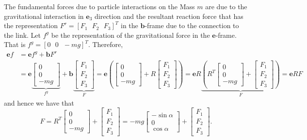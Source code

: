 \documentclass[graybox,envcountchap,sectrefs]{svmonoMuga}
\begin{document}
The fundamental forces due to particle interactions on the Mass $m$ are due to the gravitational interaction in $\mathbf{e}_3$ direction and the resultant reaction force that has the representation
$F^r=[F_1\:\:\:F_2\:\:\:F_3]^T$ in the $\mathbf{b}$-frame due to the connection to the link. Let $f^g$ be the representation of the gravitational force in the $\mathbf{e}$-frame. That is $f^g=[0\:\:\:0\:\:\:-mg]^T$.
Therefore,
\begin{align*}
\mathbf{e}f&=\mathbf{e}f^g+\mathbf{b}F^r\\
&=\mathbf{e}\underbrace{\left[\begin{matrix}
  0 \\
  0\\
  -mg
 \end{matrix}\right]}_{f^g}
+ \mathbf{b}\underbrace{\left[\begin{matrix}
  F_1 \\
  F_2\\
  F_3
 \end{matrix}\right]}_{F}=\mathbf{e} \left(\left[\begin{matrix}
  0 \\
  0\\
  -mg
 \end{matrix}\right]
+ R\left[\begin{matrix}
  F_1 \\
  F_2\\
  F_3
 \end{matrix}\right]\right)=
 \mathbf{e} R\underbrace{\left(R^T\left[\begin{matrix}
  0 \\
  0\\
  -mg
 \end{matrix}\right]
+ \left[\begin{matrix}
  F_1 \\
  F_2\\
  F_3
 \end{matrix}\right]\right)}_{F}=\mathbf{e}RF
 \end{align*}
 and hence we have that
 \[
 F=R^T\left[\begin{matrix}
  0 \\
  0\\
  -mg
 \end{matrix}\right]
+ \left[\begin{matrix}
  F_1 \\
  F_2\\
  F_3
 \end{matrix}\right]=-mg\left[\begin{matrix}
  - \sin{\alpha}\\
   0 \\
\cos{\alpha}
 \end{matrix}\right]
+ \left[\begin{matrix}
  F_1 \\
  F_2\\
  F_3
 \end{matrix}\right].
 \]
 
\end{document}
